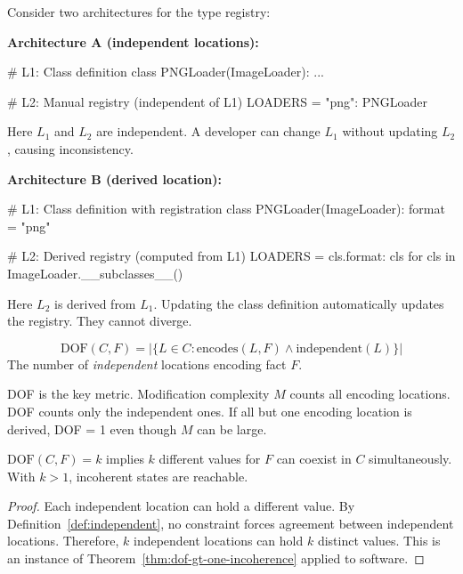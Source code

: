 \begin{example}\label{ex:independence}
Consider two architectures for the type registry:

\textbf{Architecture A (independent locations):}
\begin{code}
# L1: Class definition
class PNGLoader(ImageLoader): ...

# L2: Manual registry (independent of L1)
LOADERS = {"png": PNGLoader}
\end{code}

Here $L_1$ and $L_2$ are independent. A developer can change $L_1$ without updating $L_2$, causing inconsistency.

\textbf{Architecture B (derived location):}
\begin{code}
# L1: Class definition with registration
class PNGLoader(ImageLoader):
    format = "png"

# L2: Derived registry (computed from L1)
LOADERS = {cls.format: cls for cls in ImageLoader.__subclasses__()}
\end{code}

Here $L_2$ is derived from $L_1$. Updating the class definition automatically updates the registry. They cannot diverge.
\end{example}

\begin{definition}\label{def:dof}
\[
\text{DOF}(C, F) = |\{L \in C : \text{encodes}(L, F) \land \text{independent}(L)\}|
\]
The number of \emph{independent} locations encoding fact $F$.
\end{definition}

DOF is the key metric. Modification complexity $M$ counts all encoding locations. DOF counts only the independent ones. If all but one encoding location is derived, DOF = 1 even though $M$ can be large.

\begin{theorem}[DOF = Incoherence Potential]\label{thm:dof-inconsistency}
$\text{DOF}(C, F) = k$ implies $k$ different values for $F$ can coexist in $C$ simultaneously. With $k > 1$, incoherent states are reachable.
\end{theorem}

\begin{proof}
Each independent location can hold a different value. By Definition~\ref{def:independent}, no constraint forces agreement between independent locations. Therefore, $k$ independent locations can hold $k$ distinct values. This is an instance of Theorem~\ref{thm:dof-gt-one-incoherence} applied to software.
\end{proof}

